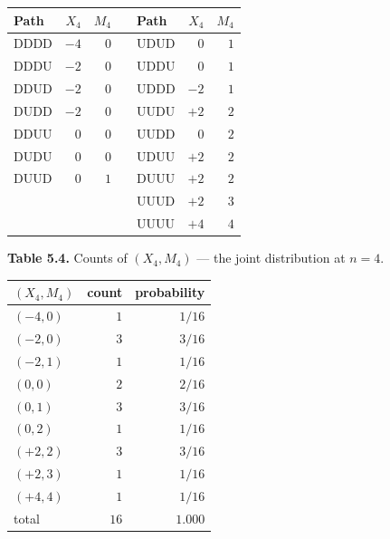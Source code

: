 \documentclass[
  10pt,
  twoside]{book}
\newcounter{none} %
\begin{document}
{\def\LTcaptype{none} %
\begin{table}[H]
\centering
\begin{tabular}{|l|r|r|l|l|r|r|}
\toprule
Path & \(X_4\) & \(M_4\) & & Path & \(X_4\) & \(M_4\) \\
\midrule



DDDD & \(-4\) & \(0\) & & UDUD & \(0\) & \(1\) \\
DDDU & \(-2\) & \(0\) & & UDDU & \(0\) & \(1\) \\
DDUD & \(-2\) & \(0\) & & UDDD & \(-2\) & \(1\) \\
DUDD & \(-2\) & \(0\) & & UUDU & \(+2\) & \(2\) \\
DDUU & \(0\) & \(0\) & & UUDD & \(0\) & \(2\) \\
DUDU & \(0\) & \(0\) & & UDUU & \(+2\) & \(2\) \\
DUUD & \(0\) & \(1\) & & DUUU & \(+2\) & \(2\) \\
& & & & UUUD & \(+2\) & \(3\) \\
& & & & UUUU & \(+4\) & \(4\) \\
\bottomrule
\end{tabular}
\end{table}
}

\textbf{Table 5.4.} Counts of \((X_4, M_4)\) --- the joint distribution
at \(n=4\).

{\def\LTcaptype{none} %
\begin{table}[H]
\centering
\begin{tabular}{|l|r|r|}
\toprule
\((X_4, M_4)\) & count & probability \\
\midrule



\((-4, 0)\) & \(1\) & \(1/16\) \\
\((-2, 0)\) & \(3\) & \(3/16\) \\
\((-2, 1)\) & \(1\) & \(1/16\) \\
\((0, 0)\) & \(2\) & \(2/16\) \\
\((0, 1)\) & \(3\) & \(3/16\) \\
\((0, 2)\) & \(1\) & \(1/16\) \\
\((+2, 2)\) & \(3\) & \(3/16\) \\
\((+2, 3)\) & \(1\) & \(1/16\) \\
\((+4, 4)\) & \(1\) & \(1/16\) \\
total & \(16\) & \(1.000\) \\
\bottomrule
\end{tabular}
\end{table}
}
\end{document}
